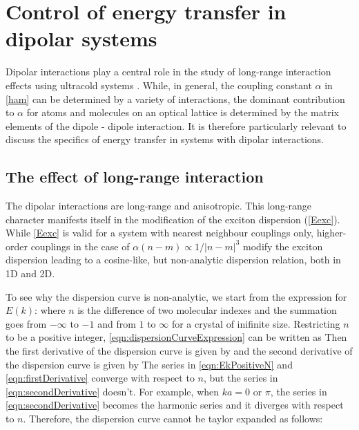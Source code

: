 \section{Control of energy transfer in dipolar systems}
\label{sec:controlEnergyTransfer}

Dipolar interactions play a central role in the study of long-range interaction effects using ultracold systems \cite{our-njp-review}.
While, in general, the coupling constant $\alpha$ in \autoref{ham} can be determined by a variety of interactions, the dominant contribution to $\alpha$ for atoms and molecules on an optical lattice is determined by the matrix elements of the dipole - dipole interaction. It is therefore particularly relevant to discuss the specifics of energy transfer in systems with dipolar interactions. 

\subsection{The effect of long-range interaction}
\label{sec:long-rangeInteraction}

The dipolar interactions are long-range and anisotropic. This long-range character
manifests itself in the modification of the exciton dispersion (\ref{Eexc}). While \autoref{Eexc} is valid for a system 
with nearest neighbour couplings only, higher-order couplings in the case of $\alpha(n-m) \propto 1/ |n-m|^3$ 
modify the exciton dispersion leading to a cosine-like, 
but non-analytic dispersion relation, both in 1D  and 2D. 

To see why the dispersion curve is non-analytic, we start from the expression for $E(k)$:
where $n$ is the difference of two molecular indexes and the summation goes from $-\infty$ to $-1$ and from
$1$ to $\infty$ for a crystal of inifinite size. Restricting $n$ to be a positive integer,
\autoref{eqn:dispersionCurveExpression} can be written as
Then the first derivative of the dispersion curve is given by
and the second derivative of the dispersion curve is given by
The series in \autoref{eqn:EkPositiveN} and \autoref{eqn:firstDerivative} converge with respect to $n$, but the 
series in \autoref{eqn:secondDerivative} doesn't. 
For example, when $k a = 0$ or $\pi$, the series in \autoref{eqn:secondDerivative} becomes the harmonic series and
 it diverges with respect to $n$. 
Therefore, the dispersion curve cannot be taylor expanded as follows:


